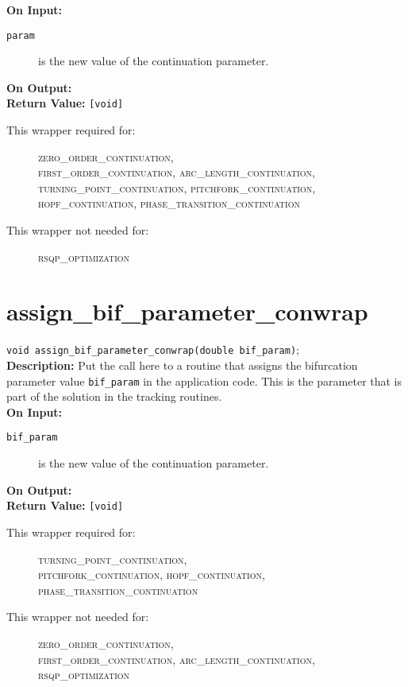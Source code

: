 {\bf On Input:}
\begin{description}
\item[\texttt{param}] is the new value of the continuation parameter.
\end{description}

{\bf On Output:} \\

{\bf Return Value:} \texttt{[void]}

\begin{description}
\item[This wrapper required for:]
\textsc{zero\_order\_continuation,\\
first\_order\_continuation, arc\_length\_continuation, \\
turning\_point\_continuation, pitchfork\_continuation, \\
hopf\_continuation, phase\_transition\_continuation}
\item[This wrapper not needed for:]
\textsc{rsqp\_optimization}
\end{description}

\section{assign\_bif\_parameter\_conwrap}
\texttt{void assign\_bif\_parameter\_conwrap(double bif\_param)}; \\

{\bf Description:}  Put the call here to a routine that assigns the bifurcation parameter value \texttt{bif\_param} in the application code. This is the parameter that is part of the solution in the tracking routines. \\

{\bf On Input:}
\begin{description}
\item[\texttt{bif\_param}] is the new value of the continuation parameter.
\end{description}

{\bf On Output:} \\

{\bf Return Value:} \texttt{[void]}

\begin{description}
\item[This wrapper required for:]
\textsc{turning\_point\_continuation, \\
pitchfork\_continuation, hopf\_continuation, \\
phase\_transition\_continuation}
\item[This wrapper not needed for:]
\textsc{zero\_order\_continuation,\\
first\_order\_continuation, arc\_length\_continuation, \\
rsqp\_optimization}
\end{description}

